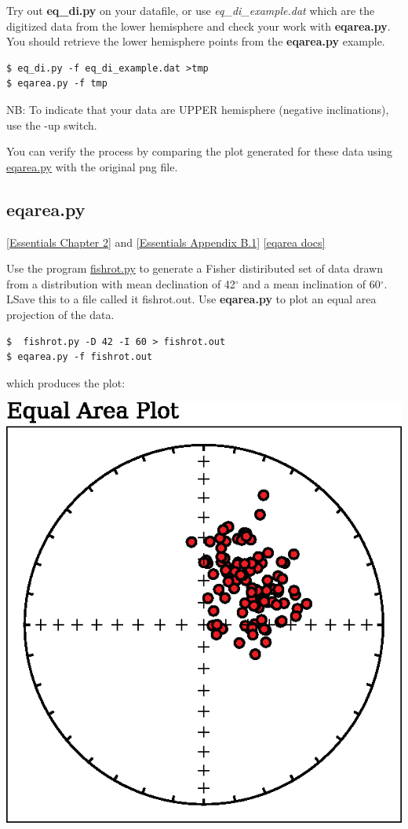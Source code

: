 \documentclass[11pt]{book}
\begin{document}
{{Try out {\bf eq\_di.py} on your datafile, or use {\it eq\_di\_example.dat} which are the digitized data from the lower hemisphere and check your work with {\bf eqarea.py}.  You should retrieve the lower hemisphere points from the {\bf eqarea.py} example.

\begin{verbatim}
$ eq_di.py -f eq_di_example.dat >tmp
$ eqarea.py -f tmp
\end{verbatim}

NB: To indicate that your data are UPPER hemisphere (negative inclinations), use the -up switch.


You can verify the process by comparing the plot generated for these data using \href{#eqarea.py}{eqarea.py} with the original png file.


%
\subsection{eqarea.py}
\href{http://earthref.org/MAGIC/books/Tauxe/Essentials/WebBook3ch2.html#ch2}{ [Essentials Chapter 2]} and
\href{http://earthref.org/MAGIC/books/Tauxe/Essentials/WebBook3ap1.html#Plots_useful_in_paleomagnetism}{[Essentials Appendix B.1]}
\href{https://github.com/PmagPy/PmagPy/blob/master/programs/eqarea.py}{[eqarea docs]}

Use the program \href{#fishrot.py}{fishrot.py} to generate a Fisher distiributed set of data drawn from a distribution with mean declination of 42$^{\circ}$ and a mean inclination of 60$^{\circ}$.  LSave this to a file called {it fishrot.out}.   Use {\bf eqarea.py} to
plot an equal area projection of the data.

\begin{verbatim}
$  fishrot.py -D 42 -I 60 > fishrot.out
$ eqarea.py -f fishrot.out
\end{verbatim}

\noindent
which produces the plot:

\includegraphics[width=12 cm]{EPSfiles/eqarea.eps}

}}
\end{document}

